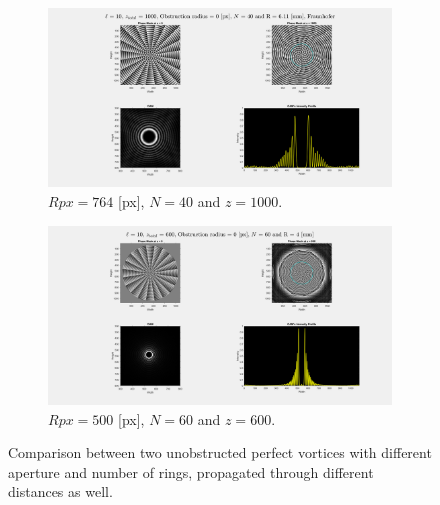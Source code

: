 \begin{figure}[htbp]
    \centering
    \begin{subfigure}[b]{0.45\textwidth}
        \centering
        \includegraphics[width=\textwidth]{images/Appendices/Additional_Results/Rpx500_N60/Unobs_perfect_1000.png}
        \caption{$Rpx=764$ [px], $N = 40$ and $z = 1000$.}
    \end{subfigure}
    \hfill
    \begin{subfigure}[b]{0.45\textwidth}
        \centering
        \includegraphics[width=\textwidth]{images/Appendices/Additional_Results/Rpx500_N60/type=1_r=0_zi=0_zf=600.png}
        \caption{$Rpx=500$ [px], $N = 60$ and $z = 600$.}
    \end{subfigure}
    \caption{Comparison between two unobstructed perfect vortices with different aperture and number of rings, propagated through different distances as well.}
    \label{fig:per_z=1000-vs-z=600}
\end{figure}

